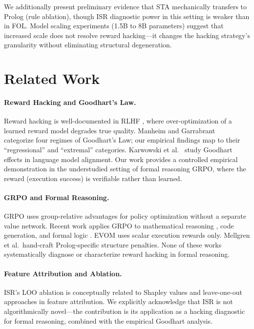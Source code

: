 \documentclass[11pt,a4paper]{article}
\begin{document}
We additionally present preliminary evidence that STA mechanically transfers to Prolog (rule ablation), though ISR diagnostic power in this setting is weaker than in FOL.
Model scaling experiments (1.5B to 8B parameters) suggest that increased scale does not resolve reward hacking---it changes the hacking strategy's granularity without eliminating structural degeneration.

\section{Related Work}

\paragraph{Reward Hacking and Goodhart's Law.}
Reward hacking is well-documented in RLHF \cite{gao2023scaling,skalse2022defining}, where over-optimization of a learned reward model degrades true quality.
Manheim and Garrabrant~\cite{manheim2019categorizing} categorize four regimes of Goodhart's Law; our empirical findings map to their ``regressional'' and ``extremal'' categories.
Karwowski et al.~\cite{karwowski2024goodhart} study Goodhart effects in language model alignment.
Our work provides a controlled empirical demonstration in the understudied setting of formal reasoning GRPO, where the reward (execution success) is verifiable rather than learned.

\paragraph{GRPO and Formal Reasoning.}
GRPO \cite{shao2024deepseekmath} uses group-relative advantages for policy optimization without a separate value network.
Recent work applies GRPO to mathematical reasoning \cite{shao2024deepseekmath}, code generation, and formal logic \cite{han2022folio}.
EVOM uses scalar execution rewards only.
Mellgren et al.\ hand-craft Prolog-specific structure penalties.
None of these works systematically diagnose or characterize reward hacking in formal reasoning.

\paragraph{Feature Attribution and Ablation.}
ISR's LOO ablation is conceptually related to Shapley values \cite{lundberg2017unified} and leave-one-out approaches in feature attribution.
We explicitly acknowledge that ISR is not algorithmically novel---the contribution is its application as a hacking diagnostic for formal reasoning, combined with the empirical Goodhart analysis.
\end{document}
